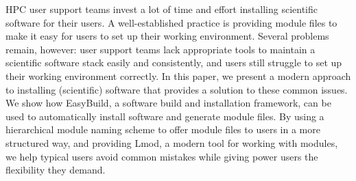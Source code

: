 HPC user support teams invest a lot of time and effort installing
scientific software for their users. A well-established practice is
providing module files to make it easy for users to set up their
working environment.  Several problems remain, however: user support
teams lack appropriate tools to maintain a scientific software stack
easily and consistently, and users still struggle to set up their
working environment correctly.  In this paper, we present a modern
approach to installing (scientific) software that provides a solution
to these common issues. We show how EasyBuild, a software build and
installation framework, can be used to automatically install software
and generate module files.  By using a hierarchical module naming
scheme to offer module files to users in a more structured way, and
providing Lmod, a modern tool for working with modules, we help
typical users avoid common mistakes while giving power users the
flexibility they demand.

